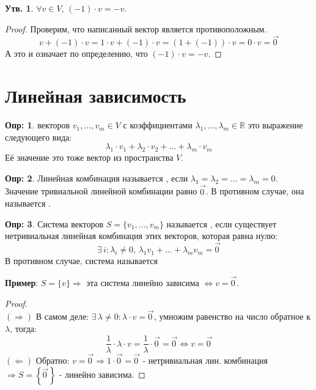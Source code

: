 \documentclass[12pt]{article}
\newcommand{\MR}{\mathbb{R}}
\theoremstyle{definition}
\newtheorem{defn}{Опр:}
\newtheorem{prop}{Утв.}
\newcommand{\vecm}[1]{\overrightarrow{#1\,}}
\begin{document}
\begin{prop}
	$\forall v \in V, \,(-1){\cdot}v = - v$.
\end{prop}
\begin{proof}
	Проверим, что написанный вектор является противоположным.
	$$
		v + (-1){\cdot}v = 1{\cdot}v + (-1){\cdot}v = (1 + (-1)){\cdot} v = 0{\cdot}v = \vecm{0}
	$$
	А это и означает по определению, что $(-1){\cdot}v = -v$.
\end{proof}
\newpage

\section*{Линейная зависимость}
\begin{defn}
	 векторов $v_1, \dotsc, v_m \in V$ с коэффициентами $\lambda_1,\dotsc, \lambda_m \in \MR$ это выражение следующего вида:
	$$
		\lambda_1 {\cdot}v_1 + \lambda_2 {\cdot} v_2 + \dotsc + \lambda_m {\cdot} v_m
	$$
	Её значение это тоже вектор из пространства $V$.
\end{defn}
\begin{defn}
	Линейная комбинация называется , если $\lambda_1 = \lambda_2 = \dotsc = \lambda_m = 0$. Значение тривиальной линейной комбинации равно $\vecm{0}$. В противном случае, она называется .
\end{defn}

\begin{defn}
	Система векторов $S = \{v_1,\dotsc, v_m\}$ называется , если существует нетривиальная линейная комбинация этих векторов, которая равна нулю:
	$$
		\exists \, i \colon \lambda_i \neq 0, \, \lambda_1 v_1 + \dotsc + \lambda_m v_m = \vecm{0}
	$$
	В противном случае, система называется 
\end{defn}

\textbf{Пример}: $S = \{v\} \Rightarrow$ эта система линейно зависима $\Leftrightarrow v = \vecm{0}$. 
\begin{proof}\hfill\\
	$(\Rightarrow)$ В самом деле: $\exists \, \lambda \neq 0 \colon \lambda{\cdot}v = \vecm{0}$, умножим равенство на число обратное к $\lambda$, тогда:
	$$
		\dfrac{1}{\lambda}{\cdot}\lambda{\cdot}v = \dfrac{1}{\lambda}{\cdot}\vecm{0} = \vecm{0} \Leftrightarrow v = \vecm{0}
	$$
	$(\Leftarrow)$ Обратно: $v = \vecm{0} \Rightarrow 1{\cdot}\vecm{0} = \vecm{0}$ - нетривиальная лин. комбинация $\Rightarrow S = \left\{\vecm{0}\right\}$ - линейно зависима.
\end{proof}
\end{document}
